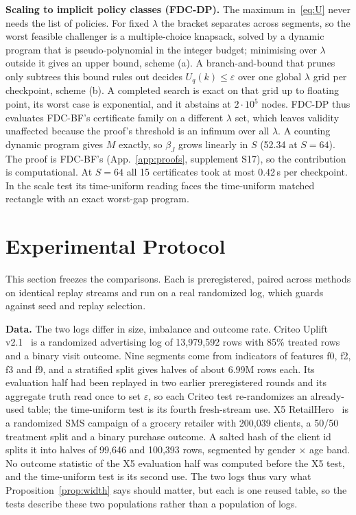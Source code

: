 \documentclass[sigconf,anonymous,review]{acmart}
\newcommand{\eps}{\varepsilon}
\begin{document}
\textbf{Scaling to implicit policy classes (FDC-DP).} The maximum in~\eqref{eq:U} never needs the list of policies. For fixed $\lambda$ the bracket separates across segments, so the worst feasible challenger is a multiple-choice knapsack, solved by a dynamic program that is pseudo-polynomial in the integer budget; minimising over $\lambda$ outside it gives an upper bound, scheme (a). A branch-and-bound that prunes only subtrees this bound rules out decides $U_q(k) \le \eps$ over one global $\lambda$ grid per checkpoint, scheme (b). A completed search is exact on that grid up to floating point, its worst case is exponential, and it abstains at $2 \cdot 10^5$ nodes. FDC-DP thus evaluates FDC-BF's certificate family on a different $\lambda$ set, which leaves validity unaffected because the proof's threshold is an infimum over all $\lambda$. A counting dynamic program gives $M$ exactly, so $\beta_J$ grows linearly in $S$ (52.34 at $S = 64$). The proof is FDC-BF's (App.~\ref{app:proofs}, supplement S17), so the contribution is computational. At $S = 64$ all 15 certificates took at most 0.42\,s per checkpoint. In the scale test its time-uniform reading faces the time-uniform matched rectangle with an exact worst-gap program.

\section{Experimental Protocol}\label{sec:protocol}

This section freezes the comparisons. Each is preregistered, paired across methods on identical replay streams and run on a real randomized log, which guards against seed and replay selection.

\textbf{Data.} The two logs differ in size, imbalance and outcome rate. Criteo Uplift v2.1~\citep{diemert2018large} is a randomized advertising log of 13,979,592 rows with 85\% treated rows and a binary visit outcome. Nine segments come from indicators of features f0, f2, f3 and f9, and a stratified split gives halves of about 6.99M rows each. Its evaluation half had been replayed in two earlier preregistered rounds and its aggregate truth read once to set $\eps$, so each Criteo test re-randomizes an already-used table; the time-uniform test is its fourth fresh-stream use. X5 RetailHero~\citep{x5retailhero2019} is a randomized SMS campaign of a grocery retailer with 200,039 clients, a 50/50 treatment split and a binary purchase outcome. A salted hash of the client id splits it into halves of 99,646 and 100,393 rows, segmented by gender $\times$ age band. No outcome statistic of the X5 evaluation half was computed before the X5 test, and the time-uniform test is its second use. The two logs thus vary what Proposition~\ref{prop:width} says should matter, but each is one reused table, so the tests describe these two populations rather than a population of logs.
\end{document}
